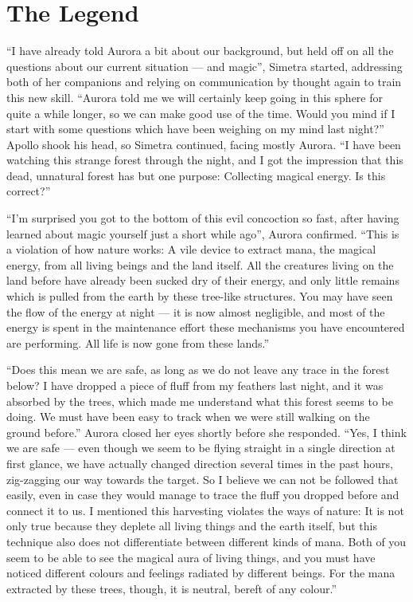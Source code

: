\chapter{The Legend}
\label{cha:the-legend}
\enquote{I have already told Aurora a bit about our background, but held off on all the questions about our current situation --- and magic}, Simetra started, addressing both of her companions and relying on communication by thought again to train this new skill. \enquote{Aurora told me we will certainly keep going in this sphere for quite a while longer, so we can make good use of the time. Would you mind if I start with some questions which have been weighing on my mind last night?}
Apollo shook his head, so Simetra continued, facing mostly Aurora. \enquote{I have been watching this strange forest through the night, and I got the impression that this dead, unnatural forest has but one purpose: Collecting magical energy. Is this correct?}

\enquote{I'm surprised you got to the bottom of this evil concoction so fast, after having learned about magic yourself just a short while ago}, Aurora confirmed. \enquote{This is a violation of how nature works: A vile device to extract mana, the magical energy, from all living beings and the land itself. All the creatures living on the land before have already been sucked dry of their energy, and only little remains which is pulled from the earth by these tree-like structures. You may have seen the flow of the energy at night --- it is now almost negligible, and most of the energy is spent in the maintenance effort these mechanisms you have encountered are performing. All life is now gone from these lands.}

\enquote{Does this mean we are safe, as long as we do not leave any trace in the forest below? I have dropped a piece of fluff from my feathers last night, and it was absorbed by the trees, which made me understand what this forest seems to be doing. We must have been easy to track when we were still walking on the ground before.}
Aurora closed her eyes shortly before she responded. \enquote{Yes, I think we are safe --- even though we seem to be flying straight in a single direction at first glance, we have actually changed direction several times in the past hours, zig-zagging our way towards the target. So I believe we can not be followed that easily, even in case they would manage to trace the fluff you dropped before and connect it to us. I mentioned this harvesting violates the ways of nature: It is not only true because they deplete all living things and the earth itself, but this technique also does not differentiate between different kinds of mana. Both of you seem to be able to see the magical aura of living things, and you must have noticed different colours and feelings radiated by different beings. For the mana extracted by these trees, though, it is neutral, bereft of any colour.}

